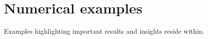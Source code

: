 \section{Numerical examples}
\label{examples}

Examples highlighting important results and insights reside within.

